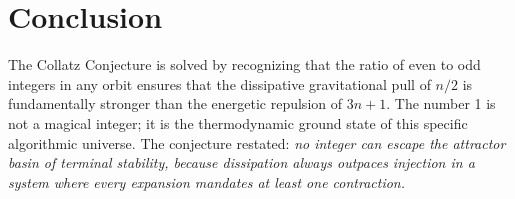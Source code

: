 \documentclass[12pt, a4paper]{article}
\theoremstyle{plain}
\theoremstyle{definition}
\begin{document}
\section{Conclusion}

The Collatz Conjecture is solved by recognizing that the ratio of even to odd integers in any orbit ensures that the dissipative gravitational pull of $n/2$ is fundamentally stronger than the energetic repulsion of $3n+1$. The number 1 is not a magical integer; it is the thermodynamic ground state of this specific algorithmic universe. The conjecture restated: \emph{no integer can escape the attractor basin of terminal stability, because dissipation always outpaces injection in a system where every expansion mandates at least one contraction.}

\vspace{2em}
\noindent\hrulefill
\vspace{1em}







\vspace{3em}
\noindent\hrulefill
\vspace{1em}
\end{document}

